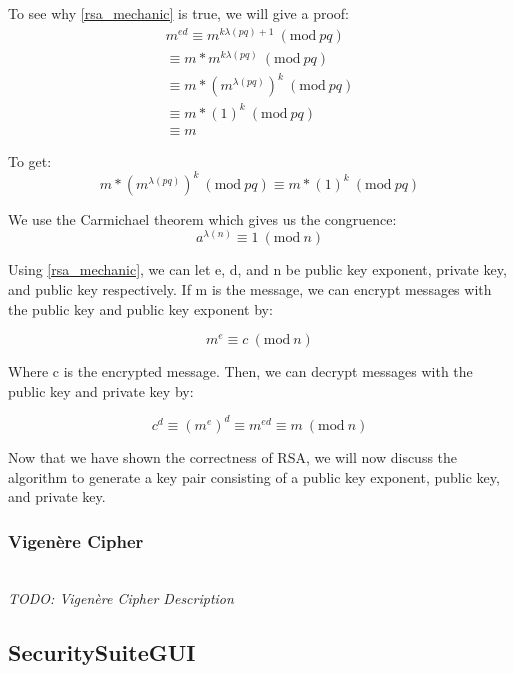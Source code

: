 \documentclass[acmlarge]{acmart}
\newcommand{\Mod}[1]{\ (\mathrm{mod}\ #1)}
\begin{document}
To see why \ref{rsa_mechanic} is true, we will give a proof:
\begin{equation}
\begin{split}
	m^{ed} 
	\equiv m^{k\lambda(pq) + 1} \Mod{pq} \\
	\equiv m * m^{k\lambda(pq)} \Mod{pq} \\
	\equiv m * (m^{\lambda(pq)})^{k} \Mod{pq} \\
	\equiv m * (1)^{k} \Mod{pq} \\
	\equiv m
\end{split}
\end{equation}

To get:
\begin{equation}
	m * (m^{\lambda(pq)})^{k} \Mod{pq} \equiv m * (1)^{k} \Mod{pq}
\end{equation}

We use the Carmichael theorem which gives us the congruence:
\begin{equation}
	a^{\lambda(n)} \equiv 1 \Mod{n}
\end{equation}

Using \ref{rsa_mechanic}, we can let e, d, and n be public key exponent, private key, and public key respectively. If m is the message, we can encrypt messages with the public key and public key exponent by:

\begin{equation}
	m^{e} \equiv c \Mod{n}
\end{equation}

Where c is the encrypted message. Then, we can decrypt messages with the public key and private key by:

\begin{equation}
	c^{d} \equiv (m^{e})^{d} \equiv m^{ed} \equiv m \Mod{n}
\end{equation}

Now that we have shown the correctness of RSA, we will now discuss the algorithm to generate a key pair consisting of a public key exponent, public key, and private key. 

\subsubsection{Vigenère Cipher}
\hspace*{\fill} \\ %
\textit{TODO: Vigenère Cipher Description}

\subsection{SecuritySuiteGUI}\label{sec:gui}
\end{document}

